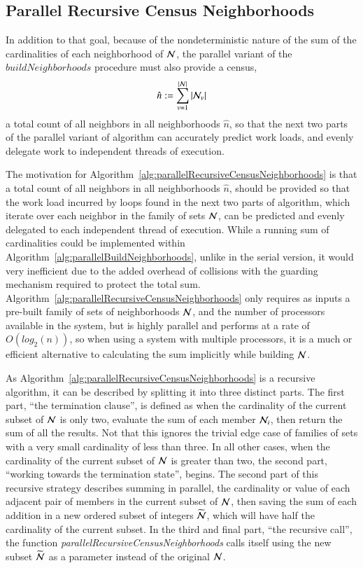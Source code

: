 %
%
\subsection{Parallel Recursive Census Neighborhoods}
\label{ch6sBNPssPRCN}
In addition to that goal, because of the nondeterministic nature of the sum of the cardinalities of each neighborhood of $\mathcal{N}$, the parallel variant of the $\mathit{buildNeighborhoods}$ procedure must also provide a census,
%
\begin{equation}
	\hat{n} := \sum\limits_{v=1}^{|\mathcal{N}|}{|\mathcal{N}_v|}
	\label{eq:censusNeighborhoods}
\end{equation}
%
a total count of all neighbors in all neighborhoods $\hat{n}$, so that the next two parts of the parallel variant of  algorithm can accurately predict work loads, and evenly delegate work to independent threads of execution.


The motivation for Algorithm~\ref{alg:parallelRecursiveCensusNeighborhoods} is that a total count of all neighbors in all neighborhoods $\hat{n}$, should be provided so that the work load incurred by loops found in the next two parts of  algorithm, which iterate over each neighbor in the family of sets $\mathcal{N}$, can be predicted and evenly delegated to each independent thread of execution. While a running sum of cardinalities could be implemented within Algorithm~\ref{alg:parallelBuildNeighborhoods}, unlike in the serial version, it would very inefficient due to the added overhead of collisions with the guarding mechanism required to protect the total sum.  Algorithm~\ref{alg:parallelRecursiveCensusNeighborhoods} only requires as inputs a pre-built family of sets of neighborhoods $\mathcal{N}$, and the number of processors available in the system, but is highly parallel and performs at a rate of $O(log_2(n))$, so when using a system with multiple processors, it is a much or efficient alternative to calculating the sum implicitly while building $\mathcal{N}$.

As Algorithm~\ref{alg:parallelRecursiveCensusNeighborhoods} is a recursive algorithm, it can be described by splitting it into three distinct parts. The first part, ``the termination clause'', is defined as when the cardinality of the current subset of $\mathcal{N}$ is only two, evaluate the sum of each member $\mathcal{N}_i$, then return the sum of all the results. Not that this ignores the trivial edge case of families of sets with a very small cardinality of less than three. In all other cases, when the cardinality of the current subset of $\mathcal{N}$ is greater than two, the second part, ``working towards the termination state'', begins. The second part of this recursive strategy describes summing in parallel, the cardinality or value of each adjacent pair of members in the current subset of $\mathcal{N}$, then saving the sum of each addition in a new ordered subset of integers $\widetilde{\mathcal{N}}$, which will have half the cardinality of the current subset. In the third and final part, ``the recursive call'', the function \textit{parallelRecursiveCensusNeighborhoods} calls itself using the new subset $\widetilde{\mathcal{N}}$ as a parameter instead of the original $\mathcal{N}$.

